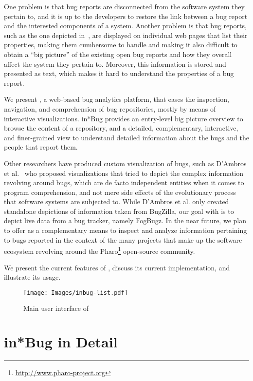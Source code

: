 One problem is that bug reports are disconnected from the software system they pertain to, and it is up to the developers to restore the link between a bug report and the interested components of a system. Another problem is that bug reports, such as the one depicted in~, are displayed on individual web pages that list their properties, making them cumbersome to handle and making it also difficult to obtain a ``big picture'' of the existing open bug reports and how they overall affect the system they pertain to. Moreover, this information is stored and presented as text, which makes it hard to understand the properties of a bug report.

We present \ib, a web-based bug analytics platform, that eases the inspection, navigation, and comprehension of bug repositories, mostly by means of interactive visualizations. in*Bug provides an entry-level big picture overview to browse the content of a repository, and a detailed, complementary, interactive, and finer-grained view to understand detailed information about the bugs and the people that report them.

Other researchers have produced custom visualization of bugs, such as D'Ambros et al.~\cite{DAmb2007a,DAmb2007b} who proposed visualizations that tried to depict the complex information revolving around bugs, which are de facto independent entities when it comes to program comprehension, and not mere side effects of the evolutionary process that software systems are subjected to. While D'Ambros et al. only created standalone depictions of information taken from BugZilla, our goal with \ib is to depict live data from a bug tracker, namely FogBugz. In the near future, we plan to offer \ib as a complementary means to inspect and analyze information pertaining to bugs reported in the context of the many projects that make up the software ecosystem revolving around the Pharo\footnote{\url{http://www.pharo-project.org}} open-source community.

We present the current features of \ib, discuss its current implementation, and illustrate its usage.


\begin{figure*}[ht]
\centering
\texttt{[image: Images/inbug-list.pdf]}
\caption{Main user interface of \ib}
\label{inbug}
\end{figure*}

\section{in*Bug in Detail}

